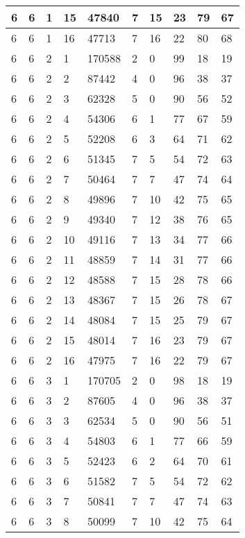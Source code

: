 \begin{table}[!ht]
\begin{tabular}{|l|l|l|l|l|l|l|l|l|l|}
        6 & 6 & 1 & 15 & 47840 & 7 & 15 & 23 & 79 & 67 \\ \hline
        6 & 6 & 1 & 16 & 47713 & 7 & 16 & 22 & 80 & 68 \\ \hline
        6 & 6 & 2 & 1 & 170588 & 2 & 0 & 99 & 18 & 19 \\ \hline
        6 & 6 & 2 & 2 & 87442 & 4 & 0 & 96 & 38 & 37 \\ \hline
        6 & 6 & 2 & 3 & 62328 & 5 & 0 & 90 & 56 & 52 \\ \hline
        6 & 6 & 2 & 4 & 54306 & 6 & 1 & 77 & 67 & 59 \\ \hline
        6 & 6 & 2 & 5 & 52208 & 6 & 3 & 64 & 71 & 62 \\ \hline
        6 & 6 & 2 & 6 & 51345 & 7 & 5 & 54 & 72 & 63 \\ \hline
        6 & 6 & 2 & 7 & 50464 & 7 & 7 & 47 & 74 & 64 \\ \hline
        6 & 6 & 2 & 8 & 49896 & 7 & 10 & 42 & 75 & 65 \\ \hline
        6 & 6 & 2 & 9 & 49340 & 7 & 12 & 38 & 76 & 65 \\ \hline
        6 & 6 & 2 & 10 & 49116 & 7 & 13 & 34 & 77 & 66 \\ \hline
        6 & 6 & 2 & 11 & 48859 & 7 & 14 & 31 & 77 & 66 \\ \hline
        6 & 6 & 2 & 12 & 48588 & 7 & 15 & 28 & 78 & 66 \\ \hline
        6 & 6 & 2 & 13 & 48367 & 7 & 15 & 26 & 78 & 67 \\ \hline
        6 & 6 & 2 & 14 & 48084 & 7 & 15 & 25 & 79 & 67 \\ \hline
        6 & 6 & 2 & 15 & 48014 & 7 & 16 & 23 & 79 & 67 \\ \hline
        6 & 6 & 2 & 16 & 47975 & 7 & 16 & 22 & 79 & 67 \\ \hline
        6 & 6 & 3 & 1 & 170705 & 2 & 0 & 98 & 18 & 19 \\ \hline
        6 & 6 & 3 & 2 & 87605 & 4 & 0 & 96 & 38 & 37 \\ \hline
        6 & 6 & 3 & 3 & 62534 & 5 & 0 & 90 & 56 & 51 \\ \hline
        6 & 6 & 3 & 4 & 54803 & 6 & 1 & 77 & 66 & 59 \\ \hline
        6 & 6 & 3 & 5 & 52423 & 6 & 2 & 64 & 70 & 61 \\ \hline
        6 & 6 & 3 & 6 & 51582 & 7 & 5 & 54 & 72 & 62 \\ \hline
        6 & 6 & 3 & 7 & 50841 & 7 & 7 & 47 & 74 & 63 \\ \hline
        6 & 6 & 3 & 8 & 50099 & 7 & 10 & 42 & 75 & 64 \\ \hline

\end{tabular}
\end{table}
